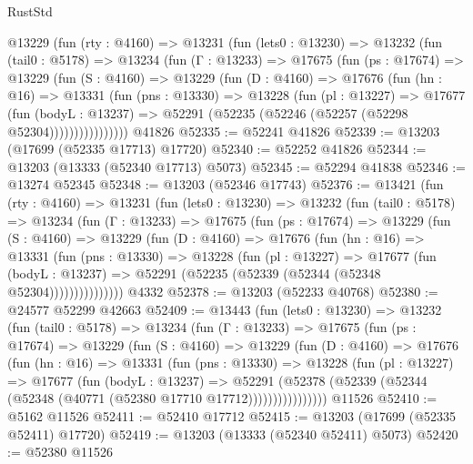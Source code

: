 \begin{lexlean}{RustStd}
\begin{coremodule}
    @13229
      (fun (rty : @4160) =>
      @13231
        (fun (lets0 : @13230) =>
        @13232
          (fun (tail0 : @5178) =>
          @13234
            (fun (Γ : @13233) =>
            @17675
              (fun (ps : @17674) =>
              @13229
                (fun (S : @4160) =>
                @13229
                  (fun (D : @4160) =>
                  @17676
                    (fun (hn : @16) =>
                    @13331
                      (fun (pns : @13330) =>
                      @13228
                        (fun (pl : @13227) =>
                        @17677
                          (fun (bodyL : @13237) =>
                          @52291 (@52235 (@52246 (@52257 (@52298 @52304))))))))))))))))
    @41826
@52335 := @52241 @41826
@52339 := @13203 (@17699 (@52335 @17713) @17720)
@52340 := @52252 @41826
@52344 := @13203 (@13333 (@52340 @17713) @5073)
@52345 := @52294 @41838
@52346 := @13274 @52345
@52348 := @13203 (@52346 @17743)
@52376 := @13421
    (fun (rty : @4160) =>
    @13231
      (fun (lets0 : @13230) =>
      @13232
        (fun (tail0 : @5178) =>
        @13234
          (fun (Γ : @13233) =>
          @17675
            (fun (ps : @17674) =>
            @13229
              (fun (S : @4160) =>
              @13229
                (fun (D : @4160) =>
                @17676
                  (fun (hn : @16) =>
                  @13331
                    (fun (pns : @13330) =>
                    @13228
                      (fun (pl : @13227) =>
                      @17677
                        (fun (bodyL : @13237) =>
                        @52291 (@52235 (@52339 (@52344 (@52348 @52304)))))))))))))))
    @4332
@52378 := @13203 (@52233 @40768)
@52380 := @24577 @52299 @42663
@52409 := @13443
    (fun (lets0 : @13230) =>
    @13232
      (fun (tail0 : @5178) =>
      @13234
        (fun (Γ : @13233) =>
        @17675
          (fun (ps : @17674) =>
          @13229
            (fun (S : @4160) =>
            @13229
              (fun (D : @4160) =>
              @17676
                (fun (hn : @16) =>
                @13331
                  (fun (pns : @13330) =>
                  @13228
                    (fun (pl : @13227) =>
                    @17677
                      (fun (bodyL : @13237) =>
                      @52291
                        (@52378
                          (@52339 (@52344 (@52348 (@40771 (@52380 @17710 @17712))))))))))))))))
    @11526
@52410 := @5162 @11526
@52411 := @52410 @17712
@52415 := @13203 (@17699 (@52335 @52411) @17720)
@52419 := @13203 (@13333 (@52340 @52411) @5073)
@52420 := @52380 @11526

\end{coremodule}
\end{lexlean}
